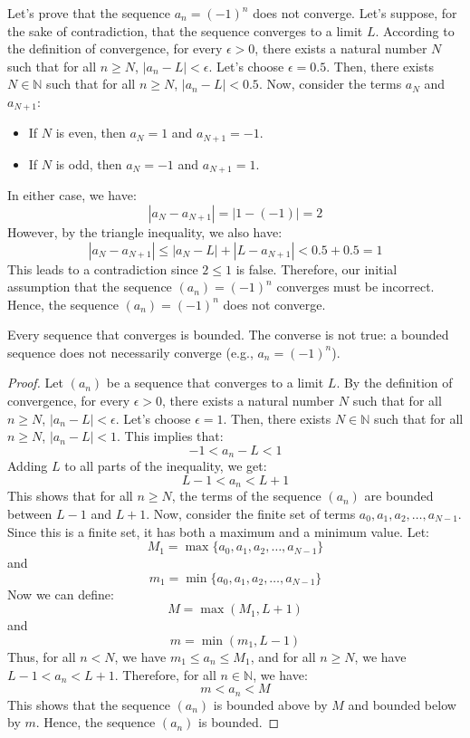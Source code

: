 \begin{eg}
    Let's prove that the sequence $a_n = (-1)^n$ does not converge. Let's suppose, for the sake of contradiction, that the sequence converges to a limit \( L \). According to the definition of convergence, for every \( \epsilon > 0 \), there exists a natural number \( N \) such that for all \( n \geq N \), \( |a_n - L| < \epsilon \).
    Let's choose \( \epsilon = 0.5 \). Then, there exists \( N \in \mathbb{N} \) such that for all \( n \geq N \), \( |a_n - L| < 0.5 \).
    Now, consider the terms \( a_N \) and \( a_{N + 1} \):
    \begin{itemize}[itemsep=1pt,label=$\circ$]
        \item If \( N \) is even, then \( a_N = 1 \) and \( a_{N + 1} = -1 \).
        \item If \( N \) is odd, then \( a_N = -1 \) and \( a_{N + 1} = 1 \).
    \end{itemize}
    In either case, we have:
    \[ |a_N - a_{N + 1}| = |1 - (-1)| = 2 \]
    However, by the triangle inequality, we also have:
    \[ |a_N - a_{N + 1}| \leq |a_N - L| + |L - a_{N + 1}| < 0.5 + 0.5 = 1 \]
    This leads to a contradiction since \( 2 \leq 1 \) is false. Therefore, our initial assumption that the sequence \( (a_n) = (-1)^n \) converges must be incorrect. Hence, the sequence \( (a_n) = (-1)^n \) does not converge.
\end{eg}
Every sequence that converges is bounded. The converse is not true: a bounded sequence does not necessarily converge (e.g., $a_n = (-1)^n$).
\begin{proof}
    Let \( (a_n) \) be a sequence that converges to a limit \( L \). By the definition of convergence, for every \( \epsilon > 0 \), there exists a natural number \( N \) such that for all \( n \geq N \), \( |a_n - L| < \epsilon \).
    Let's choose \( \epsilon = 1 \). Then, there exists \( N \in \mathbb{N} \) such that for all \( n \geq N \), \( |a_n - L| < 1 \). This implies that:
    \[ -1 < a_n - L < 1 \]
    Adding \( L \) to all parts of the inequality, we get:
    \[ L - 1 < a_n < L + 1 \]
    This shows that for all \( n \geq N \), the terms of the sequence \( (a_n) \) are bounded between \( L - 1 \) and \( L + 1 \).
    Now, consider the finite set of terms \( a_0, a_1, a_2, \ldots, a_{N-1} \). Since this is a finite set, it has both a maximum and a minimum value. Let:
    \[ M_1 = \max\{a_0, a_1, a_2, \ldots, a_{N-1}\} \]
    and
    \[ m_1 = \min\{a_0, a_1, a_2, \ldots, a_{N-1}\} \]
    Now we can define:
    \[ M = \max(M_1, L + 1) \]
    and
    \[ m = \min(m_1, L - 1) \]
    Thus, for all \( n < N \), we have \( m_1 \leq a_n \leq M_1 \), and for all \( n \geq N \), we have \( L - 1 < a_n < L + 1 \). Therefore, for all \( n \in \mathbb{N} \), we have:
    \[ m < a_n < M \]
    This shows that the sequence \( (a_n) \) is bounded above by \( M \) and bounded below by \( m \). Hence, the sequence \( (a_n) \) is bounded.
\end{proof}

